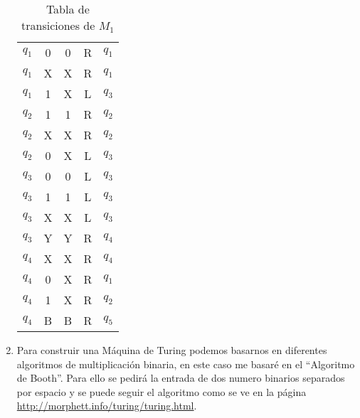 \documentclass[spanish, fleqn]{article}
\begin{document}
\begin{enumerate}
\begin{table}[h]
\begin{tabular}{|c|c|c|c|c|}
				\hline 	
				$q_1$ & 0 & 0 & R & $q_1$ \\
				$q_1$ & X & X & R & $q_1$ \\
				$q_1$ & 1 & X & L & $q_3$ \\
				\hline
				$q_2$ & 1 & 1 & R & $q_2$ \\
				$q_2$ & X & X & R & $q_2$ \\
				$q_2$ & 0 & X & L & $q_3$ \\
				\hline
				$q_3$ & 0 & 0 & L & $q_3$ \\
				$q_3$ & 1 & 1 & L & $q_3$ \\
				$q_3$ & X & X & L & $q_3$ \\
				$q_3$ & Y & Y & R & $q_4$ \\
				\hline
				$q_4$ & X & X & R & $q_4$ \\
				$q_4$ & 0 & X & R & $q_1$ \\
				$q_4$ & 1 & X & R & $q_2$ \\
				$q_4$ & B & B & R & $q_5$ \\
				\hline
			\end{tabular}
			\caption{Tabla de transiciones de $M_1$}
			\label{tablatm}
		\end{table}
		
	\item
		Para construir una Máquina de Turing podemos basarnos en diferentes
		algoritmos de multiplicación binaria, en este caso me basaré en el 
		``Algoritmo de Booth\footnotemark[1]''. Para ello se pedirá la entrada
		de dos numero binarios separados por espacio y se puede seguir el 
		algoritmo como se ve en la página 
		\url{http://morphett.info/turing/turing.html}.


\end{enumerate}
\end{document}
